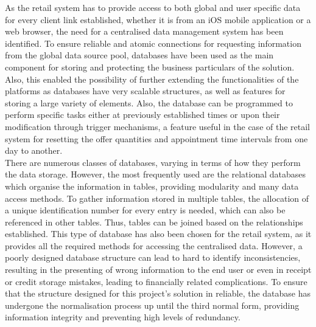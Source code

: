 As the retail system has to provide access to both global and user specific data for every client link established, whether it is from an iOS mobile application or a web browser, the need for a centralised data management system has been identified. To ensure reliable and atomic connections for requesting information from the global data source pool, databases have been used as the main component for storing and protecting the business particulars of the solution. Also, this enabled the possibility of further extending the functionalities of the platforms as databases have very scalable structures, as well as features for storing a large variety of elements\cite{what_is_database}. Also, the database can be programmed to perform specific tasks either at previously established times or upon their modification through trigger mechanisms, a feature useful in the case of the retail system for resetting the offer quantities and appointment time intervals from one day to another.\\

There are numerous classes of databases, varying in terms of how they perform the data storage. However, the most frequently used are the relational databases which organise the information in tables, providing modularity and many data access methods. To gather information stored in multiple tables, the allocation of a unique identification number for every entry is needed, which can also be referenced in other tables. Thus, tables can be joined based on the relationships established. This type of database has also been chosen for the retail system, as it provides all the required methods for accessing the centralised data. However, a poorly designed database structure can lead to hard to identify inconsistencies, resulting in the presenting of wrong information to the end user or even in receipt or credit storage mistakes, leading to financially related complications. To ensure that the structure designed for this project's solution in reliable, the database has undergone the normalisation process up until the third normal form, providing information integrity and preventing high levels of redundancy\cite{curcin_2016}.\\

